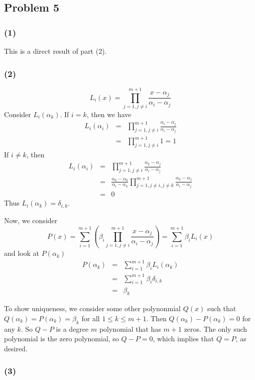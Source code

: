 \documentclass{article}
\begin{document}
\subsection{Problem 5}
\subsubsection{(1)}
This is a direct result of part (2).

\subsubsection{(2)}
\[L_i(x) = \prod_{j=1, j \neq i}^{m+1}\frac{x-\alpha_j}{\alpha_i-\alpha_j}\]
Consider $L_i(\alpha_k)$. If $i = k$, then we have 
\begin{eqnarray*}
L_i(\alpha_i) 
&=& \prod_{j=1, j \neq i}^{m+1}\frac{\alpha_i-\alpha_j}{\alpha_i-\alpha_j}\\
&=& \prod_{j=1, j \neq i}^{m+1}1 = 1
\end{eqnarray*}
If $i \neq k$, then 
\begin{eqnarray*}
L_i(\alpha_i) 
&=& \prod_{j=1, j \neq i}^{m+1}\frac{\alpha_k-\alpha_j}{\alpha_i-\alpha_j}\\
&=& \frac{\alpha_k-\alpha_k}{\alpha_i-\alpha_k}\prod_{j=1, j \neq i, j \neq
k}^{m+1}\frac{\alpha_k-\alpha_j}{\alpha_i-\alpha_j} \\
&=& 0
\end{eqnarray*}
Thus $L_i(\alpha_k) = \delta_{i,k}$.
\medskip

Now, we consider
\[P(x) = \sum_{i=1}^{m+1}
    \left(\beta_i \prod_{j=1, j \neq
    i}^{m+1}\frac{x-\alpha_j}{\alpha_i-\alpha_j}\right)
     = \sum_{i=1}^{m+1} \beta_i L_i(x)
    \]
and look at $P(\alpha_k)$
\begin{eqnarray*}
P(\alpha_k) &=& \sum_{i=1}^{m+1} \beta_i L_i(\alpha_k) \\
&=& \sum_{i=1}^{m+1} \beta_i \delta_{i,k}\\
&=& \beta_k
\end{eqnarray*}

To show uniqueness, we consider some other polynonmial $Q(x)$ such that
$Q(\alpha_k) = P(\alpha_k) = \beta_k$ for all $1 \leq k \leq m+1$.
Then $Q(\alpha_k) - P(\alpha_k) = 0$ for any $k$.
So $Q - P$ is a degree $m$ polynomial that has $m+1$ zeros. 
The only such polynomial is the zero polynomial, so $Q - P = 0$, which implies
that $Q = P$, as desired.

\subsubsection{(3)}
\end{document}
